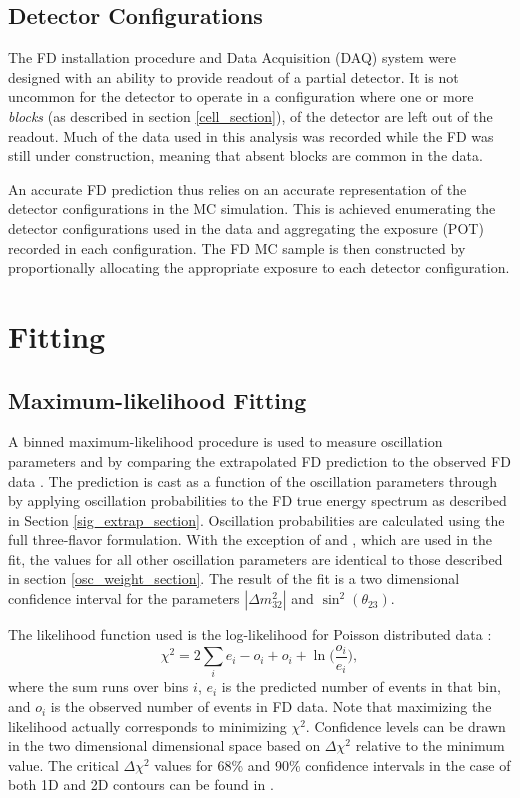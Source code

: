 \subsection{Detector Configurations}

The \nova FD installation procedure and Data Acquisition (DAQ) system were
designed with an ability to provide readout of a partial detector.
It is not uncommon for the detector to operate in a configuration where
one or more \textit{blocks} (as described in section \ref{cell_section}),
of the detector are left out of the readout.
Much of the data used in this analysis was recorded while the \nova FD
was still under construction, meaning that absent blocks are common
in the data.

An accurate FD prediction thus relies on an accurate representation
of the detector configurations in the MC simulation.
This is achieved enumerating the detector configurations
used in the data and aggregating the exposure (POT) recorded
in each configuration.
The FD MC sample is then constructed by proportionally allocating
the appropriate exposure to each detector configuration.

\section{Fitting}

\label{fitting_section}

\subsection{Maximum-likelihood Fitting}
\label{bayesian_fitting_section}

A binned maximum-likelihood procedure is used to measure oscillation parameters
\deltamtht and \thetatth by comparing the extrapolated FD prediction to the
observed FD data \cite{backhouse2015cafana}.
The prediction is cast as a function of the oscillation parameters
through by applying oscillation probabilities to the FD true energy spectrum
as described in Section \ref{sig_extrap_section}.
Oscillation probabilities are calculated using the full three-flavor
formulation.
With the exception of \deltamtht and \thetatth, which are used in the fit,
the values for all other oscillation parameters are identical to those
described in section \ref{osc_weight_section}.
The result of the fit is a two dimensional confidence interval
for the parameters $|\Delta m^2_{32}|$ and $\sin^2(\theta_{23})$.

The likelihood function used is the log-likelihood for Poisson distributed
data \cite{pdg}:
\begin{equation}
\chi^2 = 2 \sum_i e_i - o_i + o_i + \ln \bigg (\frac{o_i}{e_i} \bigg),
\end{equation}
where the sum runs over bins $i$, $e_i$ is the predicted number of events
in that bin, and $o_i$ is the observed number of events in FD data.
Note that maximizing the likelihood actually corresponds to minimizing
$\chi^2$.
Confidence levels can be drawn in the two dimensional dimensional space
based on $\Delta \chi^2$ relative to the minimum value.
The critical $\Delta \chi^2$ values for 68\% and 90\% confidence intervals
in the case of both 1D and 2D contours can be found in \cite{pdg}.

